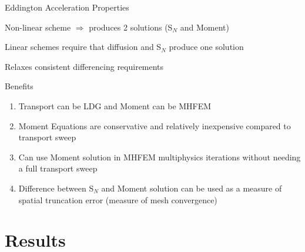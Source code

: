 \documentclass[10pt]{beamer}
\newcommand{\SN}{S$_N$\xspace}
\begin{document}
\begin{frame}{Eddington Acceleration Properties}

    Non-linear scheme $\Rightarrow$ produces 2 solutions (\SN and Moment)

    \pause 
    Linear schemes require that diffusion and \SN produce one solution 

    \pause
    Relaxes consistent differencing requirements 

    \pause
    Benefits 
    \begin{enumerate}

    	\item Transport can be LDG and Moment can be MHFEM

        \item Moment Equations are conservative and relatively inexpensive compared to transport sweep 

        \item Can use Moment solution in MHFEM multiphysics iterations without needing a full transport sweep 

        \item Difference between \SN and Moment solution can be used as a measure of spatial truncation error (measure of mesh convergence)

    \end{enumerate}

\end{frame}

\section{Results}









\end{document}
